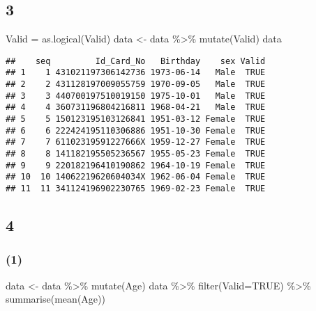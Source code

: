 \documentclass[
]{article}
\newenvironment{Shaded}{\begin{snugshade}}{\end{snugshade}}
\newcommand{\AttributeTok}[1]{\textcolor[rgb]{0.77,0.63,0.00}{#1}}
\newcommand{\ConstantTok}[1]{\textcolor[rgb]{0.00,0.00,0.00}{#1}}
\newcommand{\FunctionTok}[1]{\textcolor[rgb]{0.00,0.00,0.00}{#1}}
\newcommand{\NormalTok}[1]{#1}
\newcommand{\OtherTok}[1]{\textcolor[rgb]{0.56,0.35,0.01}{#1}}
\newcommand{\SpecialCharTok}[1]{\textcolor[rgb]{0.00,0.00,0.00}{#1}}
\begin{document}
\hypertarget{section-6}{%
\subsection{3}\label{section-6}}

\begin{Shaded}
\begin{Highlighting}[]
\NormalTok{Valid }\OtherTok{=} \FunctionTok{as.logical}\NormalTok{(Valid)}
\NormalTok{data }\OtherTok{\textless{}{-}}\NormalTok{ data }\SpecialCharTok{\%\textgreater{}\%} \FunctionTok{mutate}\NormalTok{(Valid)}
\NormalTok{data}
\end{Highlighting}
\end{Shaded}

\begin{verbatim}
##    seq         Id_Card_No   Birthday    sex Valid
## 1    1 431021197306142736 1973-06-14   Male  TRUE
## 2    2 431128197009055759 1970-09-05   Male  TRUE
## 3    3 440700197510019150 1975-10-01   Male  TRUE
## 4    4 360731196804216811 1968-04-21   Male  TRUE
## 5    5 150123195103126841 1951-03-12 Female  TRUE
## 6    6 222424195110306886 1951-10-30 Female  TRUE
## 7    7 61102319591227666X 1959-12-27 Female  TRUE
## 8    8 141182195505236567 1955-05-23 Female  TRUE
## 9    9 220182196410190862 1964-10-19 Female  TRUE
## 10  10 14062219620604034X 1962-06-04 Female  TRUE
## 11  11 341124196902230765 1969-02-23 Female  TRUE
\end{verbatim}

\hypertarget{section-7}{%
\subsection{4}\label{section-7}}

\hypertarget{section-8}{%
\subsubsection{(1)}\label{section-8}}

\begin{Shaded}
\begin{Highlighting}[]
\NormalTok{data }\OtherTok{\textless{}{-}}\NormalTok{ data }\SpecialCharTok{\%\textgreater{}\%} \FunctionTok{mutate}\NormalTok{(Age)}
\NormalTok{data }\SpecialCharTok{\%\textgreater{}\%} \FunctionTok{filter}\NormalTok{(}\AttributeTok{Valid=}\ConstantTok{TRUE}\NormalTok{) }\SpecialCharTok{\%\textgreater{}\%} \FunctionTok{summarise}\NormalTok{(}\FunctionTok{mean}\NormalTok{(Age))}
\end{Highlighting}
\end{Shaded}
\end{document}
